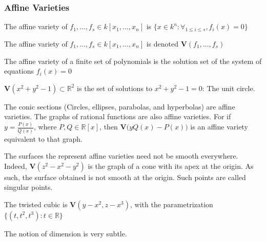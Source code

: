 \documentclass[crop=false,class=article,oneside]{standalone}
\begin{document}
        \subsubsection{Affine Varieties}
            \begin{definition}
                The affine variety of
                $f_{1},\hdots,f_{s}\in{k}[x_{1},\hdots,x_{n}]$
                is
                $\{x\in{k^{n}}:\forall_{1\leq{i}\leq{s}},f_i(x)=0\}$
            \end{definition}
            \begin{notation}
                The affine variety of
                $f_{1},\hdots,f_{s}\in k[x_{1},\hdots,x_{n}]$
                is denoted $\mathbf{V}(f_1,\hdots, f_s)$
            \end{notation}
            The affine variety of a finite set of
            polynomials is the solution set of the
            system of equations $f_{i}(x)=0$
            \begin{example}
                $\mathbf{V}(x^2+y^2-1)\subset\mathbb{R}^2$
                is the set of solutions to $x^2+y^2-1 = 0$: The unit circle.
            \end{example}
            \begin{example}
                The conic sections
                (Circles, ellipses, parabolas, and hyperbolas)
                are affine varieties. The graphs of rational
                functions are also affine varieties.
                For if $y = \frac{P(x)}{Q(x)}$, where
                $P,Q\in \mathbb{R}[x]$, then
                $\mathbf{V}\big(yQ(x)-P(x)\big)$ is an
                affine variety equivalent to that graph.
            \end{example}
            \begin{example}
                The surfaces the represent affine varieties
                need not be smooth everywhere. Indeed,
                $\mathbf{V}(z^2-x^2-y^2)$ is the graph of a cone
                with its apex at the origin. As such, the surface
                obtained is not smooth at the origin. Such points
                are called singular points.
            \end{example}
            \begin{example}
                The twisted cubic is $\mathbf{V}(y-x^2,z-x^3)$,
                with the parametrization $\{(t,t^2,t^3):t\in\mathbb{R}\}$
            \end{example}
            The notion of dimension is very subtle.
\end{document}
